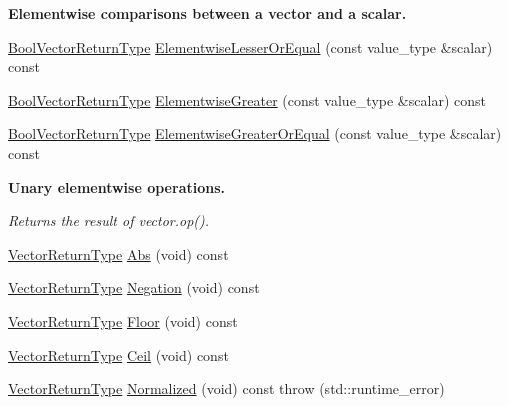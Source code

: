\begin{Indent}{\bf Elementwise comparisons between a vector and a scalar.}
\begin{DoxyCompactItemize}
\item 
\hyperlink{classvct_dynamic_const_vector_base_a2de5b9c0f8c70782c548808d3ae4a453}{Bool\-Vector\-Return\-Type} \hyperlink{classvct_dynamic_const_vector_base_a02c097407f02ef1d7ecc563eb716fb57}{Elementwise\-Lesser\-Or\-Equal} (const value\-\_\-type \&scalar) const 
\item 
\hyperlink{classvct_dynamic_const_vector_base_a2de5b9c0f8c70782c548808d3ae4a453}{Bool\-Vector\-Return\-Type} \hyperlink{classvct_dynamic_const_vector_base_aa5cf7ffe8866f97679d2224d8521fdd5}{Elementwise\-Greater} (const value\-\_\-type \&scalar) const 
\item 
\hyperlink{classvct_dynamic_const_vector_base_a2de5b9c0f8c70782c548808d3ae4a453}{Bool\-Vector\-Return\-Type} \hyperlink{classvct_dynamic_const_vector_base_aa0bd700ae135ac76eda7da5d2357da8d}{Elementwise\-Greater\-Or\-Equal} (const value\-\_\-type \&scalar) const 
\end{DoxyCompactItemize}
\end{Indent}
\begin{Indent}{\bf Unary elementwise operations.}\par
{\em Returns the result of vector.\-op(). }\begin{DoxyCompactItemize}
\item 
\hyperlink{classvct_dynamic_const_vector_base_a379e4153bb82059072257410945bf83c}{Vector\-Return\-Type} \hyperlink{classvct_dynamic_const_vector_base_a47f29acb46067b8674743e970882b26e}{Abs} (void) const 
\item 
\hyperlink{classvct_dynamic_const_vector_base_a379e4153bb82059072257410945bf83c}{Vector\-Return\-Type} \hyperlink{classvct_dynamic_const_vector_base_a7823cc80941b6d69b8a5786efe54d7c5}{Negation} (void) const 
\item 
\hyperlink{classvct_dynamic_const_vector_base_a379e4153bb82059072257410945bf83c}{Vector\-Return\-Type} \hyperlink{classvct_dynamic_const_vector_base_a3e45bcc698dd60773ff26473c7431a27}{Floor} (void) const 
\item 
\hyperlink{classvct_dynamic_const_vector_base_a379e4153bb82059072257410945bf83c}{Vector\-Return\-Type} \hyperlink{classvct_dynamic_const_vector_base_a2c185194532e6977c62565af835fa6bf}{Ceil} (void) const 
\item 
\hyperlink{classvct_dynamic_const_vector_base_a379e4153bb82059072257410945bf83c}{Vector\-Return\-Type} \hyperlink{classvct_dynamic_const_vector_base_a5fde038e2d5eb0742783eef3580f446b}{Normalized} (void) const   throw (std\-::runtime\-\_\-error)
\end{DoxyCompactItemize}
\end{Indent}

